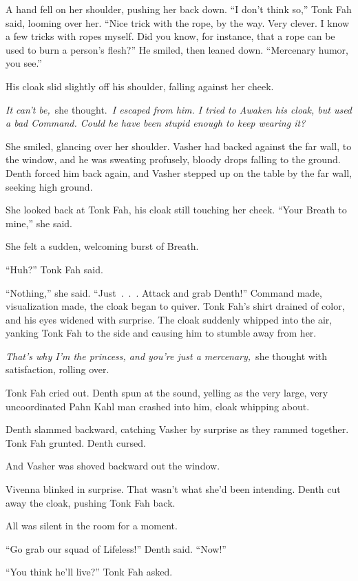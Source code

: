 A hand fell on her shoulder, pushing her back down. “I don’t think so,” Tonk Fah said, looming over her. “Nice trick with the rope, by the way. Very clever. I know a few tricks with ropes myself. Did you know, for instance, that a rope can be used to burn a person’s flesh?” He smiled, then leaned down. “Mercenary humor, you see.”

His cloak slid slightly off his shoulder, falling against her cheek.

\textit{It can’t be,}~she thought.~\textit{I escaped from him. I tried to Awaken his cloak, but used a bad Command. Could he have been stupid enough to keep wearing it?}

She smiled, glancing over her shoulder. Vasher had backed against the far wall, to the window, and he was sweating profusely, bloody drops falling to the ground. Denth forced him back again, and Vasher stepped up on the table by the far wall, seeking high ground.

She looked back at Tonk Fah, his cloak still touching her cheek. “Your Breath to mine,” she said.

She felt a sudden, welcoming burst of Breath.

“Huh?” Tonk Fah said.

“Nothing,” she said. “Just~.~.~. Attack and grab Denth!” Command made, visualization made, the cloak began to quiver. Tonk Fah’s shirt drained of color, and his eyes widened with surprise. The cloak suddenly whipped into the air, yanking Tonk Fah to the side and causing him to stumble away from her.

\textit{That’s why I’m the princess, and you’re just a mercenary,}~she thought with satisfaction, rolling over.

Tonk Fah cried out. Denth spun at the sound, yelling as the very large, very uncoordinated Pahn Kahl man crashed into him, cloak whipping about.

Denth slammed backward, catching Vasher by surprise as they rammed together. Tonk Fah grunted. Denth cursed.

And Vasher was shoved backward out the window.

Vivenna blinked in surprise. That wasn’t what she’d been intending. Denth cut away the cloak, pushing Tonk Fah back.

All was silent in the room for a moment.

“Go grab our squad of Lifeless!” Denth said. “Now!”

“You think he’ll live?” Tonk Fah asked.

